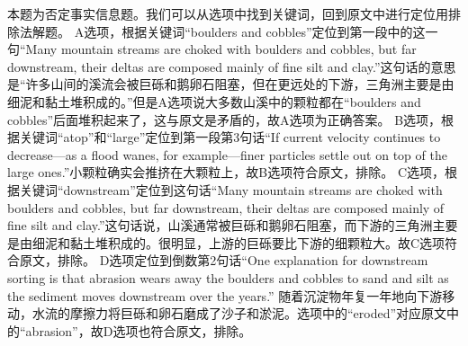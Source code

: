 \begin{blk}
    \begin{nlz}
        本题为否定事实信息题。我们可以从选项中找到关键词，回到原文中进行定位用排除法解题。 A选项，根据关键词“boulders and cobbles”定位到第一段中的这一句“Many mountain streams are choked with boulders and cobbles, but far downstream, their deltas are composed mainly of fine silt and clay.”这句话的意思是“许多山间的溪流会被巨砾和鹅卵石阻塞，但在更远处的下游，三角洲主要是由细泥和黏土堆积成的。”但是A选项说大多数山溪中的颗粒都在“boulders and cobbles”后面堆积起来了，这与原文是矛盾的，故A选项为正确答案。 B选项，根据关键词“atop”和“large”定位到第一段第3句话“If current velocity continues to decrease—as a flood wanes, for example—finer particles settle out on top of the large ones.”小颗粒确实会推挤在大颗粒上，故B选项符合原文，排除。 C选项，根据关键词“downstream”定位到这句话“Many mountain streams are choked with boulders and cobbles, but far downstream, their deltas are composed mainly of fine silt and clay.”这句话说，山溪通常被巨砾和鹅卵石阻塞，而下游的三角洲主要是由细泥和黏土堆积成的。很明显，上游的巨砾要比下游的细颗粒大。故C选项符合原文，排除。 D选项定位到倒数第2句话“One explanation for downstream sorting is that abrasion wears away the boulders and cobbles to sand and silt as the sediment moves downstream over the years.” 随着沉淀物年复一年地向下游移动，水流的摩擦力将巨砾和卵石磨成了沙子和淤泥。选项中的“eroded”对应原文中的“abrasion”，故D选项也符合原文，排除。
    \end{nlz}
\end{blk}

